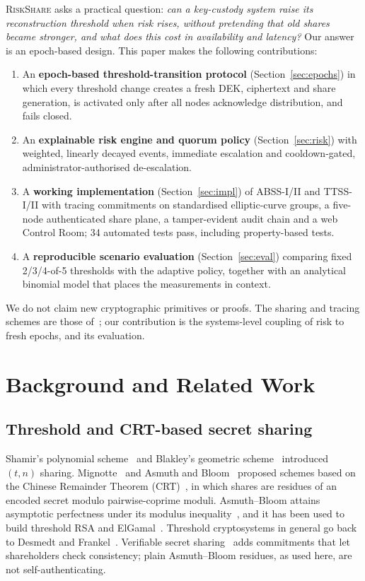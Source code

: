 \documentclass[conference]{IEEEtran}
\newcommand{\RS}{\textsc{RiskShare}}
\begin{document}
\RS{} asks a practical question: \emph{can a key-custody system raise its reconstruction threshold when risk rises, without pretending that old shares became stronger, and what does this cost in availability and latency?} Our answer is an epoch-based design. This paper makes the following contributions:
\begin{enumerate}
  \item An \textbf{epoch-based threshold-transition protocol} (Section~\ref{sec:epochs}) in which every threshold change creates a fresh DEK, ciphertext and share generation, is activated only after all nodes acknowledge distribution, and fails closed.
  \item An \textbf{explainable risk engine and quorum policy} (Section~\ref{sec:risk}) with weighted, linearly decayed events, immediate escalation and cooldown-gated, administrator-authorised de-escalation.
  \item A \textbf{working implementation} (Section~\ref{sec:impl}) of ABSS-I/II and TTSS-I/II with tracing commitments on standardised elliptic-curve groups, a five-node authenticated share plane, a tamper-evident audit chain and a web Control Room; 34 automated tests pass, including property-based tests.
  \item A \textbf{reproducible scenario evaluation} (Section~\ref{sec:eval}) comparing fixed 2/3/4-of-5 thresholds with the adaptive policy, together with an analytical binomial model that places the measurements in context.
\end{enumerate}
We do not claim new cryptographic primitives or proofs. The sharing and tracing schemes are those of~\cite{leslie2025traceable}; our contribution is the systems-level coupling of risk to fresh epochs, and its evaluation.

\section{Background and Related Work}
\label{sec:related}

\subsection{Threshold and CRT-based secret sharing}
Shamir's polynomial scheme~\cite{shamir1979share} and Blakley's geometric scheme~\cite{blakley1979safeguarding} introduced $(t,n)$ sharing. Mignotte~\cite{mignotte1983share} and Asmuth and Bloom~\cite{asmuth1983modular} proposed schemes based on the Chinese Remainder Theorem (CRT)~\cite{ding1996crt}, in which shares are residues of an encoded secret modulo pairwise-coprime moduli. Asmuth--Bloom attains asymptotic perfectness under its modulus inequality~\cite{quisquater2002crt}, and it has been used to build threshold RSA and ElGamal~\cite{kaya2007threshold}. Threshold cryptosystems in general go back to Desmedt and Frankel~\cite{desmedt1989threshold}. Verifiable secret sharing~\cite{feldman1987vss,pedersen1991vss} adds commitments that let shareholders check consistency; plain Asmuth--Bloom residues, as used here, are not self-authenticating.
\end{document}
